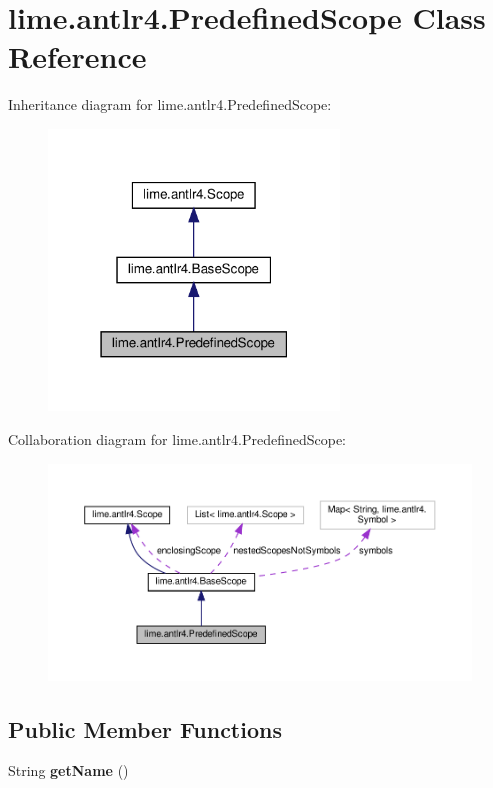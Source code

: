 \hypertarget{classlime_1_1antlr4_1_1PredefinedScope}{}\section{lime.\+antlr4.\+Predefined\+Scope Class Reference}
\label{classlime_1_1antlr4_1_1PredefinedScope}


Inheritance diagram for lime.\+antlr4.\+Predefined\+Scope\+:
\nopagebreak
\begin{figure}[H]
\begin{center}
\leavevmode
\includegraphics[width=219pt]{classlime_1_1antlr4_1_1PredefinedScope__inherit__graph}
\end{center}
\end{figure}


Collaboration diagram for lime.\+antlr4.\+Predefined\+Scope\+:
\nopagebreak
\begin{figure}[H]
\begin{center}
\leavevmode
\includegraphics[width=350pt]{classlime_1_1antlr4_1_1PredefinedScope__coll__graph}
\end{center}
\end{figure}
\subsection*{Public Member Functions}
\begin{DoxyCompactItemize}
\item 
\mbox{\label{classlime_1_1antlr4_1_1PredefinedScope_ac57f825f765c97a510da7512f5760266}} 
String {\bfseries get\+Name} ()
\end{DoxyCompactItemize}

